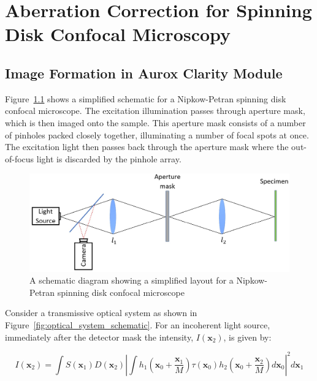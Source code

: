 \chapter{Aberration Correction for Spinning Disk Confocal Microscopy}
\label{chpt:Aurox}

\section{Image Formation in Aurox Clarity Module}
\label{sec:Aurox_image_formation}

Figure~\ref{fig:confocal_schematic} shows a simplified schematic 
for a Nipkow-Petran spinning disk confocal microscope. The 
excitation illumination passes through aperture mask, which is 
then imaged onto the sample. This aperture mask consists of a 
number of pinholes packed closely together, illuminating a number 
of focal spots at once. The excitation light then passes back 
through the aperture mask where the out-of-focus light is 
discarded by the pinhole array\cite{egger1967new,fuseler2018types}.

\begin{figure}[h]
	\centering
	\includegraphics[width=\textwidth]{images/confocal_schematic.jpg}
	\caption[Simplified Nipkow-Petran confocal layout]{A schematic diagram showing a simplified layout for a Nipkow-Petran spinning disk confocal microscope}
	\label{fig:confocal_schematic}
\end{figure}

Consider a transmissive optical system as shown in 
Figure~\ref{fig:optical_system_schematic}. For an incoherent 
light source, immediately after the detector mask the 
intensity, $I\left(\textbf{x}_{2}\right)$, is given by:

\begin{equation}\label{eq:intensity_after_detector}
I\left(\textbf{x}_{2}\right) = \int S\left(\textbf{x}_{1}\right) D\left(\textbf{x}_{2}\right) \left| \int h_{1}\left(\textbf{x}_{0} + \frac{\textbf{x}_{1}}{M}\right) \tau\left(\textbf{x}_{0}\right) h_{2}\left(\textbf{x}_{0} + \frac{\textbf{x}_{2}}{M}\right)d\textbf{x}_{0}\right|^{2}d\textbf{x}_{1}
\end{equation}


